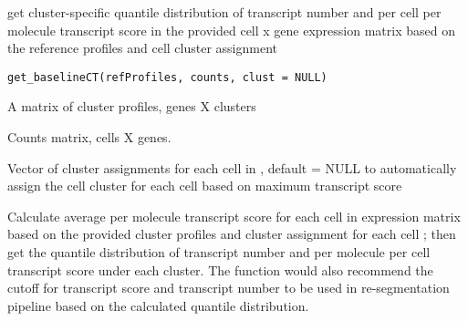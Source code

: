 \documentclass[letterpaper]{book}
\begin{document}
%
\begin{Description}
get cluster-specific quantile distribution of transcript number and per cell per molecule transcript score in the provided cell x gene expression matrix based on the reference profiles and cell cluster assignment
\end{Description}
%
\begin{Usage}
\begin{verbatim}
get_baselineCT(refProfiles, counts, clust = NULL)
\end{verbatim}
\end{Usage}
%
\begin{Arguments}
\begin{ldescription}
\item[\code{refProfiles}] A matrix of cluster profiles, genes X clusters

\item[\code{counts}] Counts matrix, cells X genes.

\item[\code{clust}] Vector of cluster assignments for each cell in , default = NULL to automatically assign the cell cluster for each cell based on maximum transcript score
\end{ldescription}
\end{Arguments}
%
\begin{Details}
Calculate average per molecule transcript score for each cell in  expression matrix based on the provided cluster profiles  and cluster assignment for each cell ; then get the quantile distribution of transcript number and per molecule per cell transcript score under each cluster. The function would also recommend the cutoff for transcript score and transcript number to be used in re-segmentation pipeline based on the calculated quantile distribution.
\end{Details}
%
\end{document}
